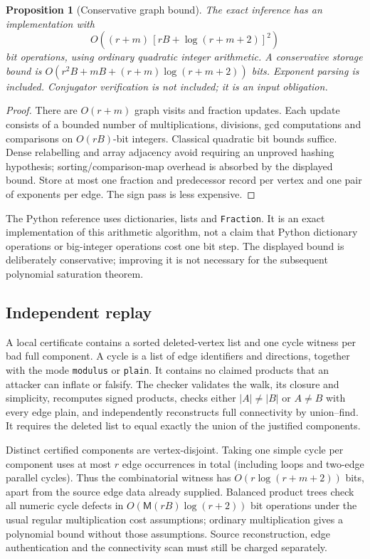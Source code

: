 \documentclass[11pt]{article}
\newtheorem{proposition}[theorem]{Proposition}
\theoremstyle{definition}\newtheorem{definition}[theorem]{Definition}
\theoremstyle{remark}\newtheorem{remark}[theorem]{Remark}
\newcommand{\code}[1]{\texttt{#1}}
\newcommand{\M}{\mathsf M}
\begin{document}
\begin{proposition}[Conservative graph bound]\label{prop:graphcost}
The exact inference has an implementation with
\begin{equation}\label{eq:graphcost}
 O\!\left((r+m)\,[rB+\log(r+m+2)]^2\right)
\end{equation}
bit operations, using ordinary quadratic integer arithmetic. A conservative
storage bound is $O(r^2B+mB+(r+m)\log(r+m+2))$ bits. Exponent parsing is
included. Conjugator verification is not included; it is an input obligation.
\end{proposition}
\begin{proof}
There are $O(r+m)$ graph visits and fraction updates. Each update consists
of a bounded number of multiplications, divisions, gcd computations and
comparisons on $O(rB)$-bit integers. Classical quadratic bit bounds suffice.
Dense relabelling and array adjacency avoid requiring an unproved hashing
hypothesis; sorting/comparison-map overhead is absorbed by the displayed
bound. Store at most one fraction and predecessor record per vertex and
one pair of exponents per edge. The sign pass is less expensive.
\end{proof}
The Python reference uses dictionaries, lists and \code{Fraction}. It is
an exact implementation of this arithmetic algorithm, not a claim that
Python dictionary operations or big-integer operations cost one bit step.
The displayed bound is deliberately conservative; improving it is not
necessary for the subsequent polynomial saturation theorem.

\subsection{Independent replay}
A local certificate contains a sorted deleted-vertex list and one cycle
witness per bad full component. A cycle is a list of edge identifiers and
directions, together with the mode \code{modulus} or \code{plain}. It
contains no claimed products that an attacker can inflate or falsify.
The checker validates the walk, its closure and simplicity, recomputes
signed products, checks either $|A|\ne|B|$ or $A\ne B$ with every edge
plain, and independently reconstructs full connectivity by union--find.
It requires the deleted list to equal exactly the union of the justified
components.

Distinct certified components are vertex-disjoint. Taking one simple cycle
per component uses at most $r$ edge occurrences in total (including loops
and two-edge parallel cycles). Thus the combinatorial witness has
$O(r\log(r+m+2))$ bits, apart from the source edge data already supplied.
Balanced product trees check all numeric cycle defects in
$O(\M(rB)\log(r+2))$ bit operations under the usual regular multiplication
cost assumptions; ordinary multiplication gives a polynomial bound without
those assumptions. Source reconstruction, edge authentication and the
connectivity scan must still be charged separately.
\end{document}
